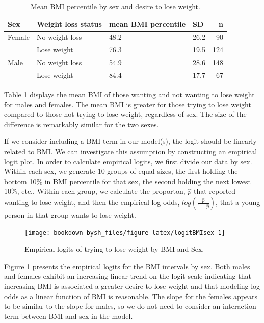 \documentclass[
]{krantz}
\begin{document}
\begin{table}[t]

\caption{\label{tab:table3chp6}Mean BMI percentile by sex and desire to lose weight.}
\centering
\begin{tabular}{llllr}
\toprule
Sex & Weight loss status & mean BMI percentile & SD & n\\
\midrule
Female & No weight loss & 48.2 & 26.2 & 90\\
 & Lose weight & 76.3 & 19.5 & 124\\
Male & No weight loss & 54.9 & 28.6 & 148\\
 & Lose weight & 84.4 & 17.7 & 67\\
\bottomrule
\end{tabular}
\end{table}

Table \ref{tab:table3chp6} displays the mean BMI of those wanting and not wanting to lose weight for males and females. The mean BMI is greater for those trying to lose weight compared to those not trying to lose weight, regardless of sex. The size of the difference is remarkably similar for the two sexes.

If we consider including a BMI term in our model(s), the logit should be linearly related to BMI. We can investigate this assumption by constructing an empirical logit plot. In order to calculate empirical logits, we first divide our data by sex. Within each sex, we generate 10 groups of equal sizes, the first holding the bottom 10\% in BMI percentile for that sex, the second holding the next lowest 10\%, etc.. Within each group, we calculate the proporton, \(\hat{p}\) that reported wanting to lose weight, and then the empirical log odds, \(log(\frac{\hat{p}}{1-\hat{p}})\), that a young person in that group wants to lose weight.

\begin{figure}

{\centering \texttt{[image: bookdown-bysh\_files/figure-latex/logitBMIsex-1]} 

}

\caption{Empirical logits of trying to lose weight by BMI and Sex.}\label{fig:logitBMIsex}
\end{figure}

Figure \ref{fig:logitBMIsex} presents the empirical logits for the BMI intervals by sex. Both males and females exhibit an increasing linear trend on the logit scale indicating that increasing BMI is associated a greater desire to lose weight and that modeling log odds as a linear function of BMI is reasonable. The slope for the females appears to be similar to the slope for males, so we do not need to consider an interaction term between BMI and sex in the model.
\end{document}
